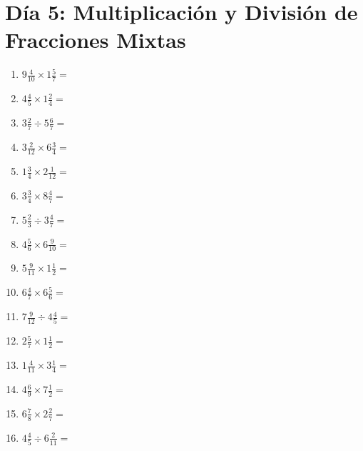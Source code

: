 \documentclass[12pt]{article}
\begin{document}
\section*{Día 5: Multiplicación y División de Fracciones Mixtas}
\begin{enumerate}
\item \large $ 9 \frac{4}{10} \times 1 \frac{5}{7} = $ \vspace{1.6cm}
\item \large $ 4 \frac{4}{5} \times 1 \frac{2}{4} = $ \vspace{1.6cm}
\item \large $ 3 \frac{2}{7} \div 5 \frac{6}{7} = $ \vspace{1.6cm}
\item \large $ 3 \frac{2}{12} \times 6 \frac{3}{4} = $ \vspace{1.6cm}
\item \large $ 1 \frac{3}{4} \times 2 \frac{1}{12} = $ \vspace{1.6cm}
\item \large $ 3 \frac{3}{4} \times 8 \frac{4}{7} = $ \vspace{1.6cm}
\item \large $ 5 \frac{2}{3} \div 3 \frac{4}{7} = $ \vspace{1.6cm}
\item \large $ 4 \frac{5}{6} \times 6 \frac{9}{10} = $ \vspace{1.6cm}
\item \large $ 5 \frac{9}{11} \times 1 \frac{1}{2} = $ \vspace{1.6cm}
\item \large $ 6 \frac{4}{7} \times 6 \frac{5}{6} = $ \vspace{1.6cm}
\newpage
\item \large $ 7 \frac{9}{12} \div 4 \frac{4}{5} = $ \vspace{1.6cm}
\item \large $ 2 \frac{5}{7} \times 1 \frac{1}{2} = $ \vspace{1.6cm}
\item \large $ 1 \frac{4}{11} \times 3 \frac{1}{4} = $ \vspace{1.6cm}
\item \large $ 4 \frac{6}{9} \times 7 \frac{1}{2} = $ \vspace{1.6cm}
\item \large $ 6 \frac{7}{8} \times 2 \frac{2}{7} = $ \vspace{1.6cm}
\item \large $ 4 \frac{4}{5} \div 6 \frac{2}{11} = $ \vspace{1.6cm}

\end{enumerate}
\end{document}
